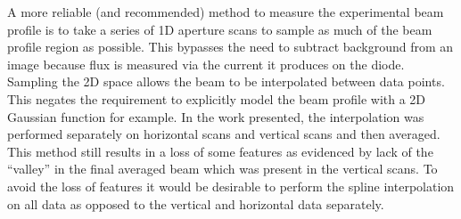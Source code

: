 A more reliable (and recommended) method to measure the experimental beam profile is to take a series of 1D aperture scans to sample as much of the beam profile region as possible.
This bypasses the need to subtract background from an image because flux is measured via the current it produces on the diode.
Sampling the 2D space allows the beam to be interpolated between data points.
This negates the requirement to explicitly model the beam profile with a 2D Gaussian function for example.
In the work presented, the interpolation was performed separately on horizontal scans and vertical scans and then averaged.
This method still results in a loss of some features as evidenced by lack of the ``valley'' in the final averaged beam which was present in the vertical scans.
To avoid the loss of features it would be desirable to perform the spline interpolation on all data as opposed to the vertical and horizontal data separately.
